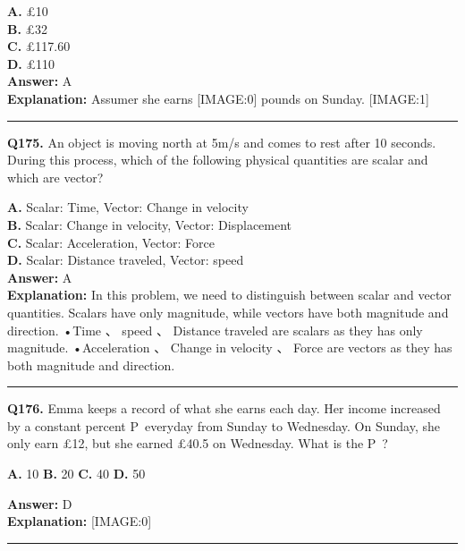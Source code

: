 \documentclass[12pt]{article}
\begin{document}
\textbf{A.} £10 \\
\textbf{B.} £32 \\
\textbf{C.} £117.60 \\
\textbf{D.} £110 \\

\textbf{Answer:} A \\
\textbf{Explanation:} Assumer she earns
[IMAGE:0]
pounds on Sunday.
[IMAGE:1]

\hrule
\vspace{1em}


\noindent
\textbf{Q175.} An object is moving north at 5m/s and comes to rest after 10 seconds. During this process, which of the following physical quantities are scalar and which are vector?



\textbf{A.} Scalar: Time, Vector: Change in velocity \\
\textbf{B.} Scalar: Change in velocity, Vector: Displacement \\
\textbf{C.} Scalar: Acceleration, Vector: Force \\
\textbf{D.} Scalar: Distance traveled, Vector: speed \\

\textbf{Answer:} A \\
\textbf{Explanation:} In this problem, we need to distinguish between scalar and vector quantities. Scalars have only magnitude, while vectors have both magnitude and direction.
•Time
、
speed
、
Distance traveled are scalars as they has only magnitude.
•Acceleration
、
Change in velocity
、
Force are vectors as they has both magnitude and direction.

\hrule
\vspace{1em}


\noindent
\textbf{Q176.} Emma keeps a record of what she earns each day.
Her income increased by a constant percent P everyday from Sunday to Wednesday. On Sunday, she only earn £12, but she earned £40.5 on Wednesday. What is the P ?



\textbf{A.} 10%
\textbf{B.} 20%
\textbf{C.} 40%
\textbf{D.} 50%

\textbf{Answer:} D \\
\textbf{Explanation:} [IMAGE:0]

\hrule
\vspace{1em}
\end{document}
